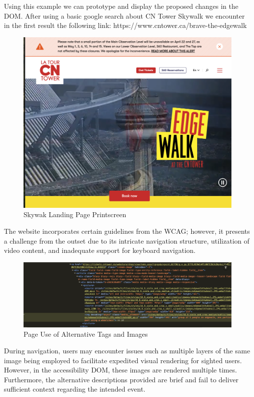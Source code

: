 \documentclass[conference]{IEEEtran}
\begin{document}
 Using this example we can prototype and display the proposed changes in the DOM. After using a basic google search about CN Tower Skywalk we encounter in the first result the following link:
 https://www.cntower.ca/brave-the-edgewalk

 \begin{figure}[h]
\centerline{\includegraphics[width=\linewidth]{images/1.png}}
\caption{Skywak Landing Page Printscreen}
\label{fig2}
\end{figure}

The website incorporates certain guidelines from the WCAG; however, it presents a challenge from the outset due to its intricate navigation structure, utilization of video content, and inadequate support for keyboard navigation.

\begin{figure}[h]
\centerline{\includegraphics[width=\linewidth]{images/2.png}}
\caption{Page Use of Alternative Tags and Images}
\label{fig2}
\end{figure}

During navigation, users may encounter issues such as multiple layers of the same image being employed to facilitate expedited visual rendering for sighted users. However, in the accessibility DOM, these images are rendered multiple times. Furthermore, the alternative descriptions provided are brief and fail to deliver sufficient context regarding the intended event.
\end{document}
